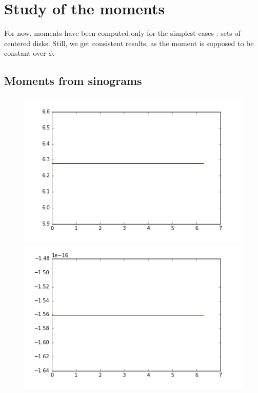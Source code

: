 \documentclass[a4,12pt]{article}
\begin{document}
\section{Study of the moments}
For now, moments have been computed only for the simplest cases : sets of centered disks. Still, we get consistent results, as the moment is supposed to be constant over $\phi$.
\subsection{Moments from sinograms}
\begin{figure}[h!]
   \begin{minipage}[c]{.46\linewidth}
      \includegraphics[scale=0.5]{../images/moments/unitDiskMoment0.png} 
   \end{minipage} \hfill
   \begin{minipage}[c]{.46\linewidth}
      \includegraphics[scale=0.5]{../images/moments/unitDiskMoment1.png}  
   \end{minipage}
\end{figure}
\end{document}
